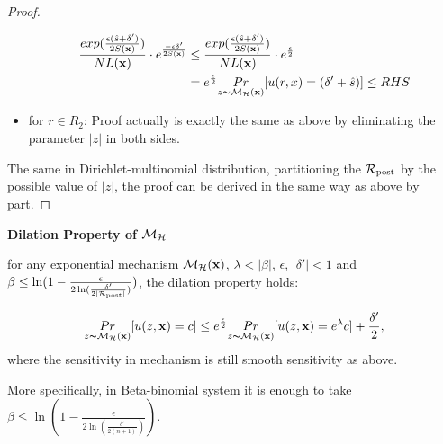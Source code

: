 \documentclass{article}
\begin{document}
\begin{proof}
\begin{itemize}
		\begin{equation*}
		\begin{split}
		\frac{exp(\frac{\epsilon (\hat{s} + \delta')}{2 S(\textbf{x})})}{NL(\textbf{x})} \cdot e^{\frac{- \epsilon \delta'}{2 S(\textbf{x})}}
		& \leq \frac{exp(\frac{\epsilon (\hat{s} + \delta')}{2 S(\textbf{x})})}{NL(\textbf{x})} \cdot e^{\frac{\epsilon}{2}}\\
		&  =  e^{\frac{\epsilon}{2}} \underset{z \thicksim \mathcal{M}_{\mathcal{H}}(\textbf{x})}{Pr}[u(r,x) = (\delta' + \hat{s})] \leq RHS\\
		\end{split}
		\end{equation*}
	\item for $r \in R_2$: Proof actually is exactly the same as above by eliminating the parameter $|z|$ in both sides.
\end{itemize}

The same in Dirichlet-multinomial distribution, partitioning the $\mathcal{R}_{\textup{post}}$ by the possible value of $|z|$, the proof can be derived in the same way as above by part.

\end{proof}



\noindent \textbf{Dilation Property of $\mathcal{M}_{\mathcal{H}}$}
\begin{lem}
\label{lem_dilation}
for any exponential mechanism $\mathcal{M}_{\mathcal{H}}(\textbf{x})$, $\lambda < |\beta|$, $\epsilon$, $|\delta'| < 1$ and $\beta \leq \ln(1 - \frac{\epsilon}{2 \ln (\frac{\delta'}{2 |\mathcal{R}_{\textup{post}}|})})$, the dilation property holds:

\begin{equation*}
\underset{z \thicksim \mathcal{M}_{\mathcal{H}}(\textbf{x})}{Pr}[u(z,\textbf{x}) = c]
\leq
e^{\frac{\epsilon}{2}} \underset{z \thicksim \mathcal{M}_{\mathcal{H}}(\textbf{x})}{Pr}[u(z,\textbf{x}) = e^{\lambda} c] + \frac{\delta'}{2},
\end{equation*}
where the sensitivity in mechanism is still smooth sensitivity as above.

More specifically, in Beta-binomial system it is enough to take $\beta \leq \ln(1 - \frac{\epsilon}{2 \ln (\frac{\delta'}{2 (n + 1)})})$.
\end{lem}
\end{document}
